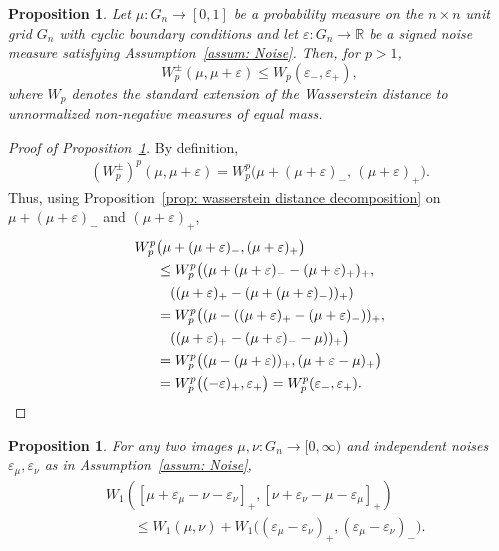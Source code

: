 \documentclass{article}
\theoremstyle{plain}
\newtheorem{prop}[thm]{Proposition}
\theoremstyle{definition}
\theoremstyle{remark}
\begin{document}
\begin{prop}\label{prop: additive noise wasserstein}
    Let $\mu:G_n \to [0,1]$ be a probability measure on the $n \times n$ unit grid $G_n$ with cyclic boundary conditions and let $\varepsilon : G_n \to \mathbb{R}$ be a signed noise measure satisfying Assumption~\ref{assum: Noise}.
    Then, for $p>1$,
    \begin{equation}
        W^\pm_p(\mu,\mu+\varepsilon) \le W_p(\varepsilon_-,\varepsilon_+),
    \end{equation}
    where $W_p$ denotes the standard extension of the Wasserstein distance to unnormalized non-negative measures of equal mass.
\end{prop}

\begin{proof}[Proof of Proposition~\ref{prop: additive noise wasserstein}]\label{proof: additive noise wasserstein}
   By definition, 
    \begin{align}
        (W_p^\pm)^p(\mu,\mu+\varepsilon)
        =W_p^p\big(\mu+(\mu+\varepsilon)_- ,\, (\mu+\varepsilon)_+\big).
    \end{align}
    Thus, using Proposition~\ref{prop: wasserstein distance decomposition} on $\mu+(\mu+\varepsilon)_-$ and $(\mu+\varepsilon)_+$, 
    \begin{align}
        W_p^p&\big(\mu+(\mu+\varepsilon)_-,
            (\mu+\varepsilon)_+\big)\\
        &\le W_p^p\big((\mu+(\mu+\varepsilon)_- - (\mu+\varepsilon)_+)_+,\\ 
            &\quad ((\mu+\varepsilon)_+ - (\mu+(\mu+\varepsilon)_-))_+)\\
        &= W_p^p\big((\mu - ((\mu+\varepsilon)_+ - (\mu+\varepsilon)_-))_+,
            \\&\quad((\mu+\varepsilon)_+ -(\mu+\varepsilon)_- - \mu))_+\big)\\
        &=W_p^p\big((\mu - (\mu+\varepsilon))_+,
            (\mu+\varepsilon - \mu)_+\big)\\
        &=W_p^p\big((-\varepsilon)_+,\varepsilon_+\big)
        =W_p^p(\varepsilon_-,\varepsilon_+). \qedhere
    \end{align}
\end{proof}


\begin{prop}\label{prop: Decomposition via KR duality}
For any two images $\mu,\nu:G_n\to[0,\infty)$ and independent noises $\varepsilon_\mu,\varepsilon_\nu$ as in Assumption~\ref{assum: Noise},
\begin{align}
    &W_1([\mu+\varepsilon_\mu - \nu - \varepsilon_\nu]_+, [\nu+\varepsilon_\nu - \mu - \varepsilon_\mu]_+)\\
    &\qquad\le W_1(\mu,\nu)+W_1\big((\varepsilon_\mu-\varepsilon_\nu)_+,(\varepsilon_\mu-\varepsilon_\nu)_-\big). \nonumber
\end{align}
\end{prop}
\end{document}

